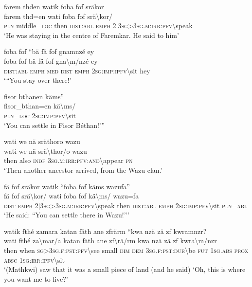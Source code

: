 \ea\label{ex:1:a3752}
farem thden watik foba fof sräkor\\
\gll farem	thd=en	wati	foba	fof	srä{\textbackslash}kor/\\
     \textsc{pln}	middle=\textsc{loc}	then	\textsc{dist}:\textsc{abl}	\textsc{emph}	2|3\textsc{sg}>3\textsc{sg}.\textsc{m}:\textsc{irr}:\textsc{pfv}{\textbackslash}speak\\
\glt `He was staying in the centre of Faremkar. He said to him'
\z

\ea\label{ex:1:a3753}
foba fof ``bä fä fof gnamnzé ey\\
\gll foba	fof	bä	fä	fof	gna{\textbackslash}m/nzé	ey\\
     \textsc{dist}:\textsc{abl}	\textsc{emph}	\textsc{med}	\textsc{dist}	\textsc{emph}	2\textsc{sg}:\textsc{imp}:\textsc{ipfv}{\textbackslash}sit	hey\\
\glt `{``}You stay over there!'
\z

\ea\label{ex:1:a3754}
fisor bthanen käms''\\
\gll fisor\_bthan=en	kä{\textbackslash}ms/\\
     \textsc{pln}=\textsc{loc}	2\textsc{sg}:\textsc{imp}:\textsc{pfv}{\textbackslash}sit\\
\glt `You can settle in Fisor Béthan!'''
\z

\ea\label{ex:1:a3755}
wati we nä sräthoro wazu\\
\gll wati	we	nä	srä{\textbackslash}thor/o	wazu\\
     then	also	\textsc{indf}	3\textsc{sg}.\textsc{m}:\textsc{irr}:\textsc{pfv}:\textsc{and}{\textbackslash}appear	\textsc{pn}\\
\glt `Then another ancestor arrived, from the Wazu clan.'
\z

\ea\label{ex:1:a3758}
fä fof sräkor watik ``foba fof käms wazufa''\\
\gll fä	fof	srä{\textbackslash}kor/	wati	foba	fof	kä{\textbackslash}ms/	wazu=fa\\
     \textsc{dist}	\textsc{emph}	2|3\textsc{sg}>3\textsc{sg}.\textsc{m}:\textsc{irr}:\textsc{pfv}{\textbackslash}speak	then	\textsc{dist}:\textsc{abl}	\textsc{emph}	2\textsc{sg}:\textsc{imp}:\textsc{pfv}{\textbackslash}sit	\textsc{pln}=\textsc{abl}\\
\glt `He said: ``You can settle there in Wazu!'''
\z

\ea\label{ex:1:a3759}
watik fthé zamara katan fäth ane zfrärm ``kwa nzä zä zf kwramnzr?\\
\gll wati	fthé	za{\textbackslash}mar/a	katan	fäth	ane	zf{\textbackslash}rä/rm	kwa	nzä	zä	zf	kwra{\textbackslash}m/nzr\\
     then	when	\textsc{sg}>3\textsc{sg}.\textsc{f}:\textsc{pst}:\textsc{pfv}{\textbackslash}see	small	\textsc{dim}	\textsc{dem}	3\textsc{sg}.\textsc{f}:\textsc{pst}:\textsc{dur}{\textbackslash}be	\textsc{fut}	1\textsc{sg}.\textsc{abs}	\textsc{prox}	\textsc{absc}	1\textsc{sg}:\textsc{irr}:\textsc{ipfv}{\textbackslash}sit\\
\glt `(Mathkwi) saw that it was a small piece of land (and he said) ‘Oh, this is where you want me to live?'
\z

